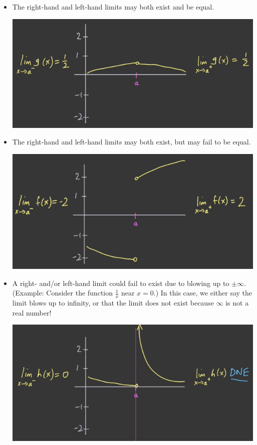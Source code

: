 \documentclass{article}
\begin{document}
\begin{itemize}
    \item The right-hand and left-hand limits may both exist and be equal.
    \begin{center}\includegraphics[scale = 0.5]{Images/PossibleBehavior1.png}\end{center}
    \item The right-hand and left-hand limits may both exist, but may fail to be equal.
    \begin{center}\includegraphics[scale = 0.5]{Images/PossibleBehavior2.png}\end{center}
    \item A right- and/or left-hand limit could fail to exist due to blowing up to $\pm\infty$.
    (Example: Consider the function $\frac{1}{x}$ near $x = 0$.) In this case, we either say the
    limit blows up to infinity, or that the limit does not exist because $\infty$ is not a real number!
    \begin{center}\includegraphics[scale = 0.5]{Images/PossibleBehavior3.png}\end{center}

\end{itemize}
\end{document}
